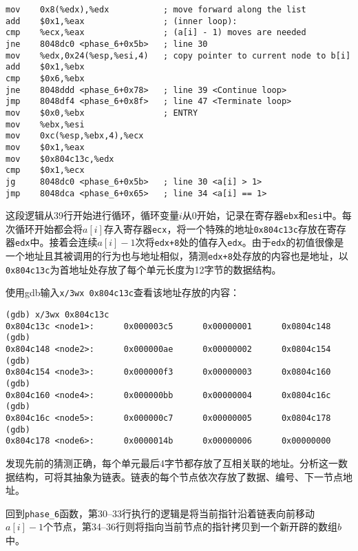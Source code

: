\documentclass[a4paper, 11pt]{ctexart}
\begin{document}
\begin{verbatim}
mov    0x8(%edx),%edx           ; move forward along the list
add    $0x1,%eax                ; (inner loop):
cmp    %ecx,%eax                ; (a[i] - 1) moves are needed
jne    8048dc0 <phase_6+0x5b>   ; line 30
mov    %edx,0x24(%esp,%esi,4)   ; copy pointer to current node to b[i]
add    $0x1,%ebx
cmp    $0x6,%ebx
jne    8048ddd <phase_6+0x78>   ; line 39 <Continue loop>
jmp    8048df4 <phase_6+0x8f>   ; line 47 <Terminate loop>
mov    $0x0,%ebx                ; ENTRY
mov    %ebx,%esi
mov    0xc(%esp,%ebx,4),%ecx
mov    $0x1,%eax
mov    $0x804c13c,%edx
cmp    $0x1,%ecx
jg     8048dc0 <phase_6+0x5b>   ; line 30 <a[i] > 1>
jmp    8048dca <phase_6+0x65>   ; line 34 <a[i] == 1>
\end{verbatim}

这段逻辑从39行开始进行循环，循环变量$i$从$0$开始，记录在寄存器\texttt{ebx}和\texttt{esi}中。每次循环开始都会将$a[i]$存入寄存器\texttt{ecx}，将一个特殊的地址\texttt{0x804c13c}存放在寄存器\texttt{edx}中。接着会连续$a[i]-1$次将\texttt{edx+8}处的值存入\texttt{edx}。由于\texttt{edx}的初值很像是一个地址且其被调用的行为也与地址相似，猜测\texttt{edx+8}处存放的内容也是地址，以\texttt{0x804c13c}为首地址处存放了每个单元长度为12字节的数据结构。

使用gdb输入\texttt{x/3wx 0x804c13c}查看该地址存放的内容：

\begin{verbatim}
(gdb) x/3wx 0x804c13c
0x804c13c <node1>:      0x000003c5      0x00000001      0x0804c148
(gdb)
0x804c148 <node2>:      0x000000ae      0x00000002      0x0804c154
(gdb)
0x804c154 <node3>:      0x000000f3      0x00000003      0x0804c160
(gdb)
0x804c160 <node4>:      0x000000bb      0x00000004      0x0804c16c
(gdb)
0x804c16c <node5>:      0x000000c7      0x00000005      0x0804c178
(gdb)
0x804c178 <node6>:      0x0000014b      0x00000006      0x00000000
\end{verbatim}

发现先前的猜测正确，每个单元最后4字节都存放了互相关联的地址。分析这一数据结构，可将其抽象为链表。链表的每个节点依次存放了数据、编号、下一节点地址。

回到\texttt{phase\_6}函数，第30--33行执行的逻辑是将当前指针沿着链表向前移动$a[i]-1$个节点，第34--36行则将指向当前节点的指针拷贝到一个新开辟的数组$b$中。
\end{document}
